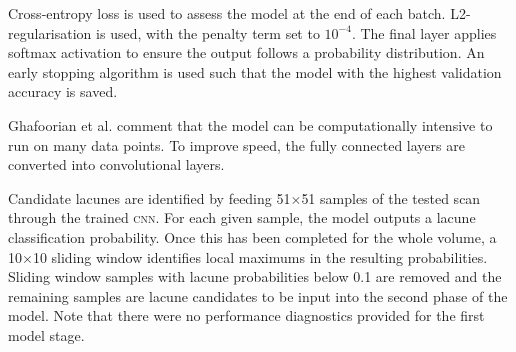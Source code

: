 Cross-entropy loss is used to assess the model at the end of each batch. L2-regularisation is used, with the penalty term set to $10^{-4}$. The final layer applies softmax activation to ensure the output follows a probability distribution. An early stopping algorithm is used such that the model with the highest validation accuracy is saved.

Ghafoorian et al. comment that the model can be computationally intensive to run on many data points. To improve speed, the fully connected layers are converted into convolutional layers.

Candidate lacunes are identified by feeding 51$\times$51 samples of the tested scan through the trained \textsc{cnn}. For each given sample, the model outputs a lacune classification probability. Once this has been completed for the whole volume, a 10$\times$10 sliding window identifies local maximums in the resulting probabilities. Sliding window samples with lacune probabilities below 0.1 are removed and the remaining samples are lacune candidates to be input into the second phase of the model. Note that there were no performance diagnostics provided for the first model stage.

%
%
%
%
%
%
%
%
%
%
%
%
%
%
%
%
%
%
%

